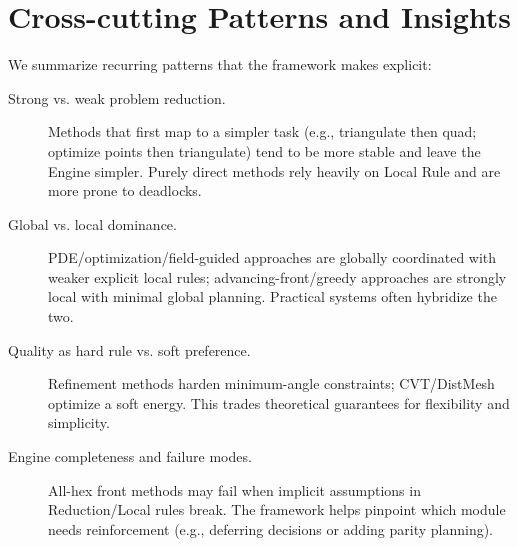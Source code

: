 \section{Cross-cutting Patterns and Insights}
We summarize recurring patterns that the framework makes explicit:
\begin{description}
  \item[Strong vs. weak problem reduction.] Methods that first map to a simpler task (e.g., triangulate then quad; optimize points then triangulate) tend to be more stable and leave the Engine simpler. Purely direct methods rely heavily on Local Rule and are more prone to deadlocks.
  \item[Global vs. local dominance.] PDE/optimization/field-guided approaches are globally coordinated with weaker explicit local rules; advancing-front/greedy approaches are strongly local with minimal global planning. Practical systems often hybridize the two.
  \item[Quality as hard rule vs. soft preference.] Refinement methods harden minimum-angle constraints; CVT/DistMesh optimize a soft energy. This trades theoretical guarantees for flexibility and simplicity.
  \item[Engine completeness and failure modes.] All-hex front methods may fail when implicit assumptions in Reduction/Local rules break. The framework helps pinpoint which module needs reinforcement (e.g., deferring decisions or adding parity planning).
\end{description}
